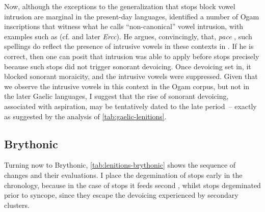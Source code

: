 \documentclass[output=paper,colorlinks,citecolor=brown]{langscibook}
\begin{document}
Now, although the exceptions to the generalization that  stops block vowel intrusion are marginal in the present\hyp day languages, \textcite{eska2012remarks} identified a number of Ogam inscriptions that witness what he calls \enquote{non\hyp canonical} vowel intrusion, with examples such as  (cf.  and later \textit{Ercc}). He argues, convincingly, that, \textit{pace} \textcite{orahilly, hind-epenthesis}, such spellings do reflect the presence of intrusive vowels in these contexts in . If he is correct, then one can posit that intrusion was able to apply before  stops precisely because such stops did not trigger sonorant devoicing. Once devoicing set in, it blocked sonorant moraicity, and the intrusive vowels were suppressed. Given that we observe the intrusive vowels in this context in the Ogam corpus, but not in the later Gaelic languages, I suggest that the rise of sonorant devoicing, associated with aspiration, may be tentatively dated to the late  period~-- exactly as suggested by the analysis of \cref{tab:gaelic-lenitions}.

\subsection{Brythonic}
\label{sec:brythonic}

Turning now to Brythonic, \cref{tab:lenitions-brythonic} shows the sequence of changes and their evaluations. I place the degemination of stops early in the chronology, because in the case of  stops it feeds second , whilst  stops degeminated prior to syncope, since they escape the devoicing experienced by secondary  clusters.
\end{document}
